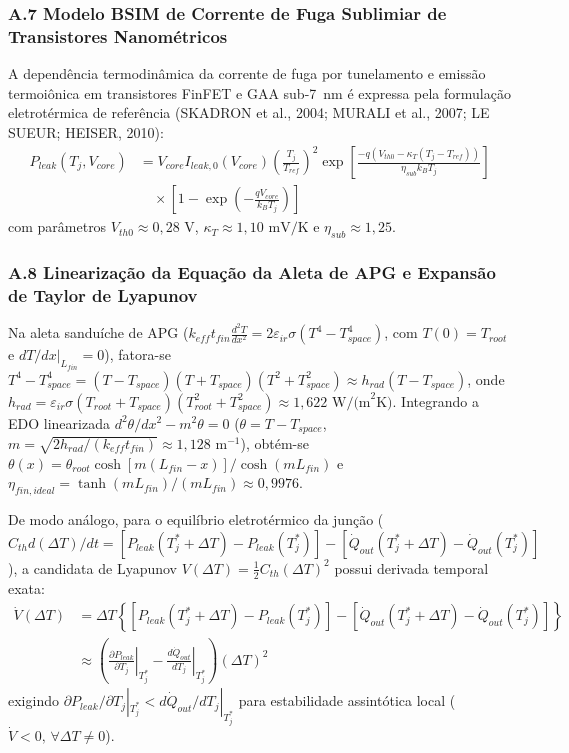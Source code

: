 \subsubsection*{A.7 Modelo BSIM de Corrente de Fuga Sublimiar de Transistores Nanométricos}

A dependência termodinâmica da corrente de fuga por tunelamento e emissão termoiônica em transistores FinFET e GAA sub-7~nm é expressa pela formulação eletrotérmica de referência (SKADRON et al., 2004; MURALI et al., 2007; LE SUEUR; HEISER, 2010):
\begin{align}
    P_{leak}(T_j, V_{core}) &= V_{core} I_{leak,0}(V_{core}) \left( \frac{T_j}{T_{ref}} \right)^2 \exp\left[ \frac{-q \left( V_{th0} - \kappa_T (T_j - T_{ref}) \right)}{\eta_{sub} k_B T_j} \right] \nonumber \\
    &\quad \times \left[ 1 - \exp\left( -\frac{q V_{core}}{k_B T_j} \right) \right]
\end{align}
com parâmetros $V_{th0} \approx 0{,}28\text{ V}$, $\kappa_T \approx 1{,}10\text{ mV/K}$ e $\eta_{sub} \approx 1{,}25$.

\subsubsection*{A.8 Linearização da Equação da Aleta de APG e Expansão de Taylor de Lyapunov}

Na aleta sanduíche de APG ($k_{eff} t_{fin} \frac{d^2 T}{dx^2} = 2 \varepsilon_{ir} \sigma (T^4 - T_{space}^4)$, com $T(0)=T_{root}$ e $dT/dx|_{L_{fin}}=0$), fatora-se $T^4 - T_{space}^4 = (T - T_{space})(T + T_{space})(T^2 + T_{space}^2) \approx h_{rad}(T - T_{space})$, onde $h_{rad} = \varepsilon_{ir}\sigma(T_{root} + T_{space})(T_{root}^2 + T_{space}^2) \approx 1{,}622\text{ W/(m}^2\text{K)}$. Integrando a EDO linearizada $d^2\theta/dx^2 - m^2\theta = 0$ ($\theta = T - T_{space}$, $m = \sqrt{2h_{rad}/(k_{eff}t_{fin})} \approx 1{,}128\text{ m}^{-1}$), obtém-se $\theta(x) = \theta_{root}\cosh[m(L_{fin}-x)]/\cosh(mL_{fin})$ e $\eta_{fin,ideal} = \tanh(mL_{fin})/(mL_{fin}) \approx 0{,}9976$.

De modo análogo, para o equilíbrio eletrotérmico da junção ($C_{th} d(\Delta T)/dt = [P_{leak}(T_j^*+\Delta T)-P_{leak}(T_j^*)] - [\dot{Q}_{out}(T_j^*+\Delta T)-\dot{Q}_{out}(T_j^*)]$), a candidata de Lyapunov $V(\Delta T) = \frac{1}{2}C_{th}(\Delta T)^2$ possui derivada temporal exata:
\begin{align}
    \dot{V}(\Delta T) &= \Delta T \left\{ \left[ P_{leak}(T_j^* + \Delta T) - P_{leak}(T_j^*) \right] - \left[ \dot{Q}_{out}(T_j^* + \Delta T) - \dot{Q}_{out}(T_j^*) \right] \right\} \nonumber \\
    &\approx \left( \left. \frac{\partial P_{leak}}{\partial T_j} \right|_{T_j^*} - \left. \frac{d\dot{Q}_{out}}{dT_j} \right|_{T_j^*} \right) (\Delta T)^2
\end{align}
exigindo $\partial P_{leak}/\partial T_j|_{T_j^*} < d\dot{Q}_{out}/dT_j|_{T_j^*}$ para estabilidade assintótica local ($\dot{V} < 0, \, \forall \Delta T \neq 0$).

